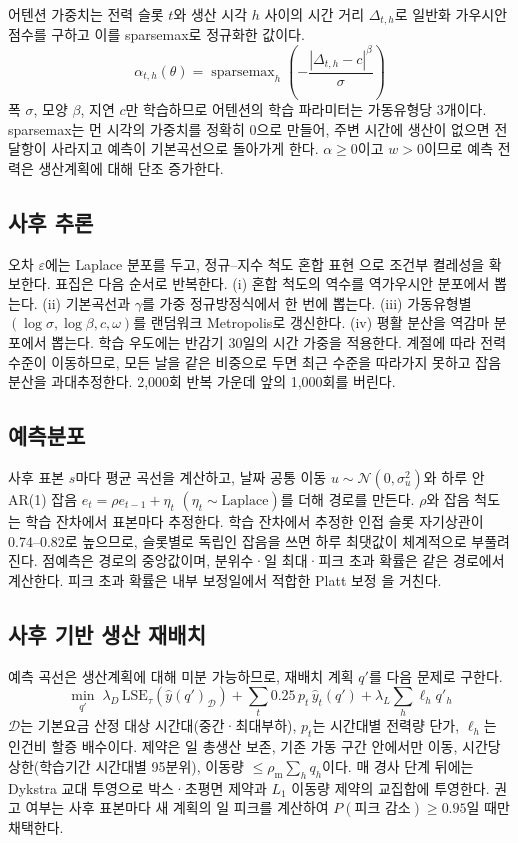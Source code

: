 어텐션 가중치는 전력 슬롯 $t$와 생산 시각 $h$ 사이의 시간 거리 $\Delta_{t,h}$로 일반화 가우시안 점수를 구하고 이를 sparsemax로 정규화한 값이다.
\begin{equation}
\alpha_{t,h}(\theta) = \operatorname{sparsemax}_h\!\left(-\frac{|\Delta_{t,h}-c|^{\beta}}{\sigma}\right)
\end{equation}
폭 $\sigma$, 모양 $\beta$, 지연 $c$만 학습하므로 어텐션의 학습 파라미터는 가동유형당 3개이다. sparsemax는 먼 시각의 가중치를 정확히 0으로 만들어, 주변 시간에 생산이 없으면 전달항이 사라지고 예측이 기본곡선으로 돌아가게 한다. $\alpha\ge 0$이고 $w>0$이므로 예측 전력은 생산계획에 대해 단조 증가한다.

\subsection{사후 추론}
오차 $\varepsilon$에는 Laplace 분포를 두고, 정규–지수 척도 혼합 표현 \citep{park2008blasso,kozumi2011bqr}으로 조건부 켤레성을 확보한다. 표집은 다음 순서로 반복한다. (i) 혼합 척도의 역수를 역가우시안 분포에서 뽑는다. (ii) 기본곡선과 $\gamma$를 가중 정규방정식에서 한 번에 뽑는다. (iii) 가동유형별 $(\log\sigma,\log\beta,c,\omega)$를 랜덤워크 Metropolis로 갱신한다. (iv) 평활 분산을 역감마 분포에서 뽑는다. 학습 우도에는 반감기 30일의 시간 가중을 적용한다. 계절에 따라 전력 수준이 이동하므로, 모든 날을 같은 비중으로 두면 최근 수준을 따라가지 못하고 잡음 분산을 과대추정한다. 2,000회 반복 가운데 앞의 1,000회를 버린다.

\subsection{예측분포}
사후 표본 $s$마다 평균 곡선을 계산하고, 날짜 공통 이동 $u\sim\mathcal{N}(0,\sigma_u^2)$와 하루 안 AR(1) 잡음 $e_t=\rho e_{t-1}+\eta_t$ $(\eta_t\sim\text{Laplace})$를 더해 경로를 만든다. $\rho$와 잡음 척도는 학습 잔차에서 표본마다 추정한다. 학습 잔차에서 추정한 인접 슬롯 자기상관이 0.74–0.82로 높으므로, 슬롯별로 독립인 잡음을 쓰면 하루 최댓값이 체계적으로 부풀려진다. 점예측은 경로의 중앙값이며, 분위수·일 최대·피크 초과 확률은 같은 경로에서 계산한다. 피크 초과 확률은 내부 보정일에서 적합한 Platt 보정 \citep{platt1999probabilistic}을 거친다.

\subsection{사후 기반 생산 재배치}
예측 곡선은 생산계획에 대해 미분 가능하므로, 재배치 계획 $q'$를 다음 문제로 구한다.
\begin{equation}
\min_{q'}\; \lambda_D\,\mathrm{LSE}_\tau\!\left(\hat y(q')_{\mathcal{D}}\right) + \sum_t 0.25\, p_t\, \hat y_t(q') + \lambda_L \sum_h \ell_h q'_h
\end{equation}
$\mathcal{D}$는 기본요금 산정 대상 시간대(중간·최대부하), $p_t$는 시간대별 전력량 단가, $\ell_h$는 인건비 할증 배수이다. 제약은 일 총생산 보존, 기존 가동 구간 안에서만 이동, 시간당 상한(학습기간 시간대별 95분위), 이동량 $\le \rho_{\mathrm{m}}\sum_h q_h$이다. 매 경사 단계 뒤에는 Dykstra 교대 투영으로 박스·초평면 제약과 $L_1$ 이동량 제약의 교집합에 투영한다. 권고 여부는 사후 표본마다 새 계획의 일 피크를 계산하여 $P(\text{피크 감소})\ge 0.95$일 때만 채택한다.

